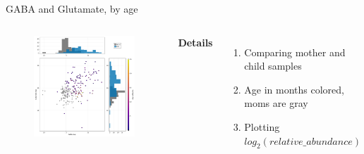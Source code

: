 
\begin{frame}{GABA and Glutamate, by age}
    \begin{columns}[c] %

    
        \begin{figure}
        \includegraphics[width=1\linewidth]{../figures/gaba-glutamate_age.png}
        \end{figure}

    
        \textbf{Details}
        \begin{enumerate}
            \item Comparing mother and child samples
            \item Age in months colored, moms are gray
            \item Plotting $log_2(relative\_abundance)$
        \end{enumerate}

    \end{columns}

\end{frame}

